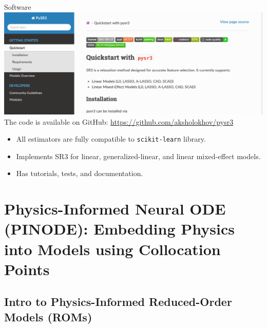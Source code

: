 \documentclass[8pt]{beamer}
\begin{document}
\begin{frame}{Software}
	\includegraphics[width=\textwidth]{Figures/pysr3_screenshot.png}
	The code is available on GitHub: \href{github.com/aksholokhov/pysr3}{https://github.com/aksholokhov/pysr3}
	\begin{itemize}
		\item All estimators are fully compatible to \texttt{scikit-learn} library.
		\item Implements SR3 for linear, generalized-linear, and linear mixed-effect models.
		\item Has tutorials, tests, and documentation.
	\end{itemize}
\end{frame}

\section{Physics-Informed Neural ODE (PINODE): Embedding Physics into Models using Collocation Points}

\subsection{Intro to Physics-Informed Reduced-Order Models (ROMs)}
\end{document}
